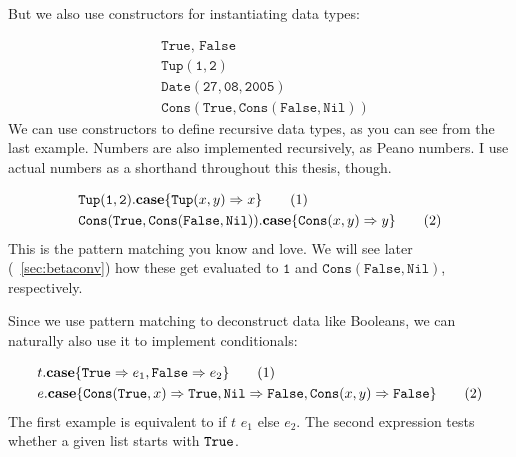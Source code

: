 \documentclass[twoside,12pt,a4paper]{article}
\begin{document}
But we also use constructors for instantiating data types:
\begin{example}
    \begin{align*}
        &\texttt{True, False}\tag{1}\\
        &\mathtt{Tup(1,2)}\tag{2}\\
        &\mathtt{Date(27, 08, 2005)}\tag{3}\\
        &\mathtt{Cons(True, Cons(False, Nil))}\tag{4}              
    \end{align*}
    We can use constructors to define recursive data types, as you can see from the last example.
    Numbers are also implemented recursively, as Peano numbers. I use actual numbers as a shorthand throughout this thesis, though.
\end{example}

\begin{example}
    \begin{align*}
        &\mathtt{Tup(1,2)}.\textbf{case}\{\mathtt{Tup(}x, y\mathtt{)}\Rightarrow x\}\tag{1}\\
        &\mathtt{Cons(True, Cons(False, Nil))}.\textbf{case}\{\mathtt{Cons(}x, y\mathtt{)}\Rightarrow y\}\tag{2}   
    \end{align*}
    This is the pattern matching you know and love. 
    We will see later (~\ref{sec:betaconv}) how these get evaluated to $\mathtt{1}$ and $\mathtt{Cons(False, Nil)}$, respectively.
\end{example}

Since we use pattern matching to deconstruct data like Booleans, we can naturally also use it to implement conditionals:
\begin{example}
    \begin{align*}
        &t.\textbf{case}\{\mathtt{True}\Rightarrow e_1, \mathtt{False}\Rightarrow e_2\} \tag{1}\\
        &e.\textbf{case}\{\mathtt{Cons(}\mathtt{True}, x\mathtt{)}\Rightarrow \mathtt{True}, 
        \mathtt{Nil\Rightarrow False}, \mathtt{Cons(}x, y\mathtt{)}\Rightarrow\mathtt{False}\}\tag{2}
    \end{align*}
The first example is equivalent to if $t$ $e_1$ else $e_2$. The second expression tests whether a given list starts with $\mathtt{True}$.
\end{example}
\end{document}
